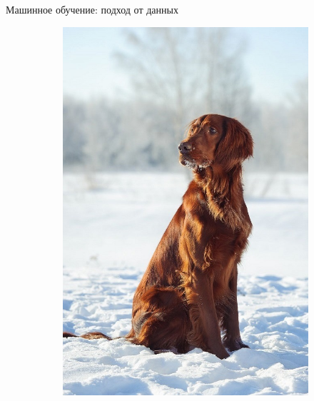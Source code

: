 \documentclass[aspectratio=169]{beamer}
\begin{document}
\begin{frame}{Машинное обучение: подход от данных}
\begin{figure}
\begin{subfigure}[b]{.1\linewidth}
            \includegraphics[width=\linewidth]{graphs/fig14_4.jpg}
        \end{subfigure}
        \begin{subfigure}[b]{.1\linewidth}

\end{subfigure}
\end{figure}
\end{frame}
\end{document}
